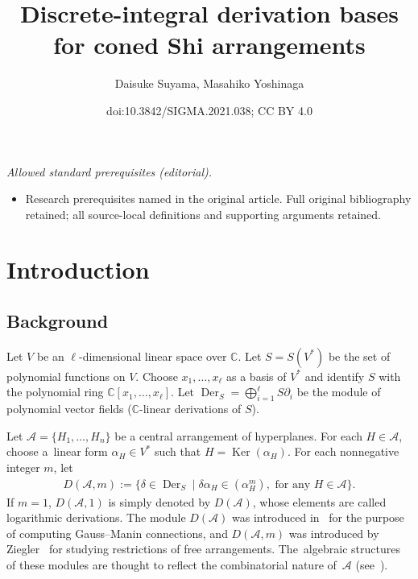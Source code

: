 \documentclass[10pt,a4paper]{amsart}
\title{Discrete-integral derivation bases for coned Shi arrangements}
\author{Daisuke Suyama, Masahiko Yoshinaga}
\date{doi:10.3842/SIGMA.2021.038; CC BY 4.0}
\numberwithin{equation}{section}
\newcommand{\A}{\mathcal{A}}
\newcommand{\C}{\mathbb{C}}
\newcommand{\Der}{\operatorname{Der}}
\newcommand{\Ker}{\operatorname{Ker}}
\begin{document}
\maketitle
\noindent\textit{Allowed standard prerequisites (editorial).}\begin{itemize}
\item Research prerequisites named in the original article. Full original bibliography retained; all source-local definitions and supporting arguments retained.
\end{itemize}\medskip
\section{Introduction}

\subsection{Background}%

Let $V$ be an $\ell$-dimensional linear space over $\C$.
Let $S=S(V^*)$ be the set of polynomial functions on $V$.
Choose $x_1, \dots, x_\ell$ as a basis of $V^*$ and identify $S$ with the
polynomial ring $\C[x_1, \dots, x_\ell]$.
Let $\Der_S=\bigoplus_{i=1}^\ell S\partial_i$ be the module of polynomial
vector fields ($\C$-linear derivations of $S$).

Let $\A=\{H_1, \dots, H_n\}$ be a central arrangement of hyperplanes.
For each $H\in\A$, choose a~linear form $\alpha_H\in V^*$ such that
$H=\Ker(\alpha_H)$.
For each nonnegative integer $m$, let
\begin{gather*}
D(\A, m):=\big\{\delta\in\Der_S\mid \delta\alpha_H\in(\alpha_H^m),
\mbox{ for any }H\in\A\big\}.
\end{gather*}
If $m=1$, $D(\A, 1)$ is simply denoted by $D(\A)$, whose elements are
called logarithmic derivations. The module $D(\A)$ was
introduced in~\cite{sai-log} for the purpose of computing Gauss--Manin
connections, and $D(\A, m)$ was introduced by Ziegler~\cite{zie} for studying
restrictions of free arrangements.
The~alge\-b\-raic structures of these modules are thought to reflect
the combinatorial nature of~$\A$ (see~\cite{ot, yos-survey}).
\end{document}
